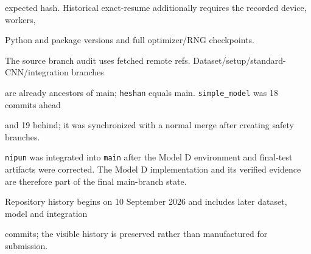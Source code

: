 \documentclass[11pt,a4paper]{article}
\DeclareRobustCommand{\code}[1]{\nolinkurl{#1}}
\begin{document}
expected hash. Historical exact-resume additionally requires the recorded device, workers,

Python and package versions and full optimizer/RNG checkpoints.



The source branch audit uses fetched remote refs. Dataset/setup/standard-CNN/integration branches

are already ancestors of main; \code{heshan} equals main. \code{simple_model} was 18 commits ahead

and 19 behind; it was synchronized with a normal merge after creating safety branches.

\code{nipun} was integrated into \code{main} after the Model D environment and final-test
artifacts were corrected. The Model D implementation and its verified evidence are therefore
part of the final main-branch state.

Repository history begins on 10 September 2026 and includes later dataset, model and integration

commits; the visible history is preserved rather than manufactured for submission.
\end{document}
